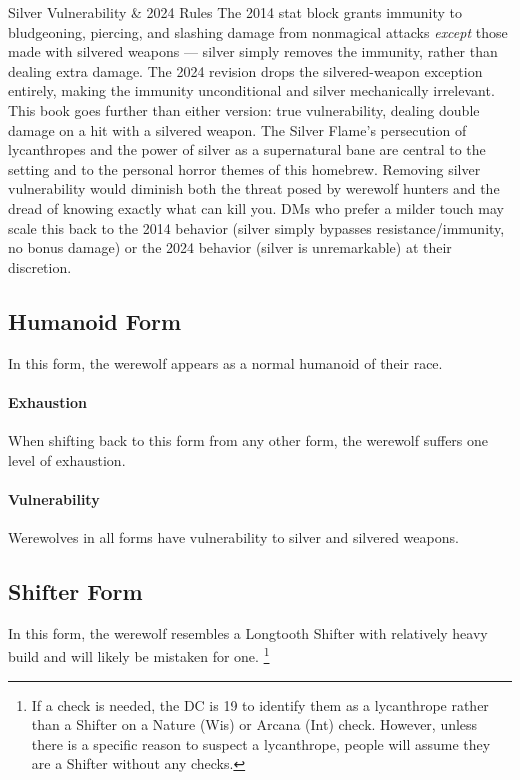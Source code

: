 \documentclass[twocolumn]{dndbook}
\begin{document}
\begin{DndSidebar}[float=!b]{Silver Vulnerability \& 2024 Rules}
    The 2014 stat block grants immunity to bludgeoning, piercing, and slashing damage from nonmagical attacks \emph{except} those made with silvered weapons --- silver simply removes the immunity, rather than dealing extra damage.
    The 2024 revision drops the silvered-weapon exception entirely, making the immunity unconditional and silver mechanically irrelevant.
    This book goes further than either version: true vulnerability, dealing double damage on a hit with a silvered weapon.
    The Silver Flame's persecution of lycanthropes and the power of silver as a supernatural bane are central to the setting and to the personal horror themes of this homebrew.
    Removing silver vulnerability would diminish both the threat posed by werewolf hunters and the dread of knowing exactly what can kill you.
    DMs who prefer a milder touch may scale this back to the 2014 behavior (silver simply bypasses resistance/immunity, no bonus damage) or the 2024 behavior (silver is unremarkable) at their discretion.
\end{DndSidebar}

\subsection*{Humanoid Form}
In this form, the werewolf appears as a normal humanoid of their race.
\paragraph*{Exhaustion} When shifting back to this form from any other form, the werewolf suffers one level of exhaustion.
\paragraph*{Vulnerability} Werewolves in all forms have vulnerability to silver and silvered weapons.


\subsection*{Shifter Form}\label{sec:shifter-form}
In this form, the werewolf resembles a Longtooth Shifter with relatively heavy build and will likely be mistaken for one.
\footnote{If a check is needed, the DC is 19 to identify them as a lycanthrope rather than a Shifter on a Nature (Wis) or Arcana (Int) check. However, unless there is a specific reason to suspect a lycanthrope, people will assume they are a Shifter without any checks.}
\end{document}
